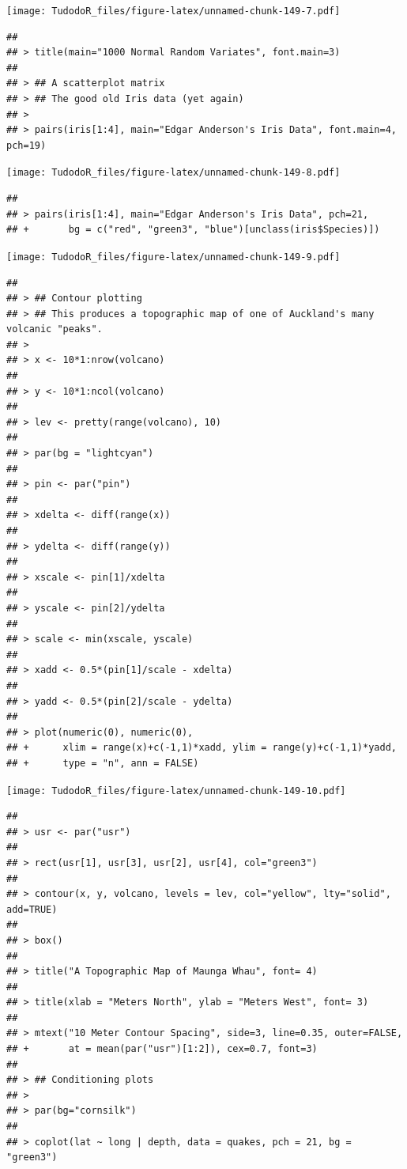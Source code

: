 \documentclass[
]{book}
\begin{document}
\texttt{[image: TudodoR\_files/figure-latex/unnamed-chunk-149-7.pdf]}

\begin{verbatim}
## 
## > title(main="1000 Normal Random Variates", font.main=3)
## 
## > ## A scatterplot matrix
## > ## The good old Iris data (yet again)
## > 
## > pairs(iris[1:4], main="Edgar Anderson's Iris Data", font.main=4, pch=19)
\end{verbatim}

\texttt{[image: TudodoR\_files/figure-latex/unnamed-chunk-149-8.pdf]}

\begin{verbatim}
## 
## > pairs(iris[1:4], main="Edgar Anderson's Iris Data", pch=21,
## +       bg = c("red", "green3", "blue")[unclass(iris$Species)])
\end{verbatim}

\texttt{[image: TudodoR\_files/figure-latex/unnamed-chunk-149-9.pdf]}

\begin{verbatim}
## 
## > ## Contour plotting
## > ## This produces a topographic map of one of Auckland's many volcanic "peaks".
## > 
## > x <- 10*1:nrow(volcano)
## 
## > y <- 10*1:ncol(volcano)
## 
## > lev <- pretty(range(volcano), 10)
## 
## > par(bg = "lightcyan")
## 
## > pin <- par("pin")
## 
## > xdelta <- diff(range(x))
## 
## > ydelta <- diff(range(y))
## 
## > xscale <- pin[1]/xdelta
## 
## > yscale <- pin[2]/ydelta
## 
## > scale <- min(xscale, yscale)
## 
## > xadd <- 0.5*(pin[1]/scale - xdelta)
## 
## > yadd <- 0.5*(pin[2]/scale - ydelta)
## 
## > plot(numeric(0), numeric(0),
## +      xlim = range(x)+c(-1,1)*xadd, ylim = range(y)+c(-1,1)*yadd,
## +      type = "n", ann = FALSE)
\end{verbatim}

\texttt{[image: TudodoR\_files/figure-latex/unnamed-chunk-149-10.pdf]}

\begin{verbatim}
## 
## > usr <- par("usr")
## 
## > rect(usr[1], usr[3], usr[2], usr[4], col="green3")
## 
## > contour(x, y, volcano, levels = lev, col="yellow", lty="solid", add=TRUE)
## 
## > box()
## 
## > title("A Topographic Map of Maunga Whau", font= 4)
## 
## > title(xlab = "Meters North", ylab = "Meters West", font= 3)
## 
## > mtext("10 Meter Contour Spacing", side=3, line=0.35, outer=FALSE,
## +       at = mean(par("usr")[1:2]), cex=0.7, font=3)
## 
## > ## Conditioning plots
## > 
## > par(bg="cornsilk")
## 
## > coplot(lat ~ long | depth, data = quakes, pch = 21, bg = "green3")
\end{verbatim}
\end{document}
